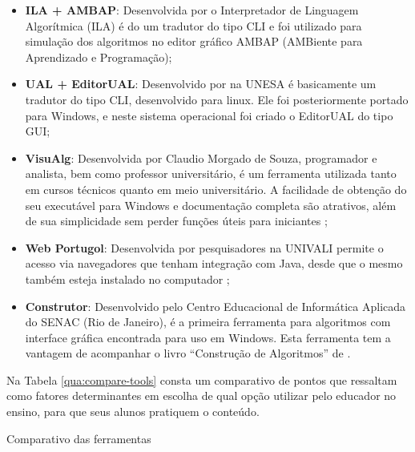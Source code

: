 \begin{itemize}

\item \textbf{ILA + AMBAP}: Desenvolvida por  o Interpretador de Linguagem Algorítmica (ILA) é do um tradutor do tipo CLI e foi utilizado para simulação dos algoritmos no editor gráfico AMBAP (AMBiente para Aprendizado e Programação);

\item \textbf{UAL + EditorUAL}: Desenvolvido por  na UNESA é basicamente um tradutor do tipo CLI, desenvolvido para linux. Ele foi posteriormente portado para Windows, e neste sistema operacional foi criado o EditorUAL do tipo GUI;

\item \textbf{VisuAlg}: Desenvolvida por Claudio Morgado de Souza, programador e analista, bem como professor universitário, é um ferramenta utilizada tanto em cursos técnicos quanto em meio universitário. A facilidade de obtenção do seu executável para Windows e documentação completa são atrativos, além de sua  simplicidade sem perder funções úteis para iniciantes \cite{souza2013etal};

\item \textbf{Web Portugol}: Desenvolvida por pesquisadores na UNIVALI permite o acesso via navegadores que tenham integração com Java, desde que o mesmo também esteja instalado no computador \cite{souza2013etal};

\item \textbf{Construtor}: Desenvolvido pelo Centro Educacional de Informática Aplicada do SENAC (Rio de Janeiro), é a primeira ferramenta para algoritmos com interface gráfica encontrada para uso em Windows. Esta ferramenta tem a vantagem de acompanhar o livro ``Construção de Algoritmos'' de .

\end{itemize}

Na Tabela \ref{qua:compare-tools} consta um comparativo de pontos que ressaltam como fatores determinantes em escolha de qual opção utilizar pelo educador no ensino, para que seus alunos pratiquem o conteúdo.

\begin{table}[h]
\centering
\caption{Comparativo das ferramentas}\label{qua:compare-tools}
  \caption*{\ifdraft{\color{green}}{}\footnotesize Fonte: Produção do autor.}
\end{table}

